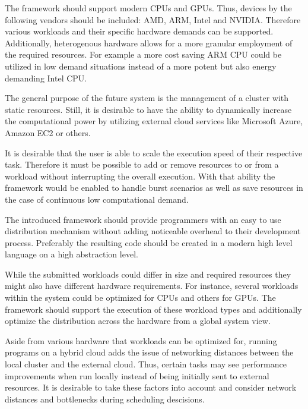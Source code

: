 \begin{description}[style=nextline]
    \item [Heterogeneity]
    The framework should support modern CPUs and GPUs. Thus, devices by the following vendors should be included: AMD, ARM, Intel and NVIDIA. Therefore various workloads and their specific hardware demands can be supported. Additionally, heterogenous hardware allows for a more granular employment of the required resources. For example a more cost saving ARM CPU could be utilized in low demand situations instead of a more potent but also energy demanding Intel CPU.

    \item [Resource Scalability]
    The general purpose of the future system is the management of a cluster with static resources. Still, it is desirable to have the ability to dynamically increase the computational power by utilizing external cloud services like Microsoft Azure, Amazon EC2 or others.

    \item [Scalable Speed]
    It is desirable that the user is able to scale the execution speed of their respective task. Therefore it must be possible to add or remove resources to or from a workload without interrupting the overall execution. With that ability the framework would be enabled to handle burst scenarios as well as save resources in the case of continuous low computational demand.

    \item [Ease of Programming]
    The introduced framework should provide programmers with an easy to use distribution mechanism without adding noticeable overhead to their development process. Preferably the resulting code should be created in a modern high level language on a high abstraction level.

    \item [Workload Diversity]
    While the submitted workloads could differ in size and required resources they might also have different hardware requirements. For instance, several workloads within the system could be optimized for CPUs and others for GPUs. The framework should support the execution of these workload types and additionally optimize the distribution across the hardware from a global system view.

    \item [Location Optimized Scheduling]
    Aside from various hardware that workloads can be optimized for, running programs on a hybrid cloud adds the issue of networking distances between the local cluster and the external cloud. Thus, certain tasks may see performance improvements when run locally instead of being initially sent to external resources. It is desirable to take these factors into account and consider network distances and bottlenecks during scheduling descisions.

\end{description}
